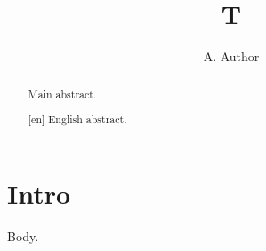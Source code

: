 \documentclass{kwmtt}
\begin{document}
\title{T}\author{A. Author}
\maketitle
\begin{abstract}
Main abstract.
\end{abstract}
\section{Intro}
Body.
\begin{abstract}[en]
English abstract.
\end{abstract}
\end{document}
